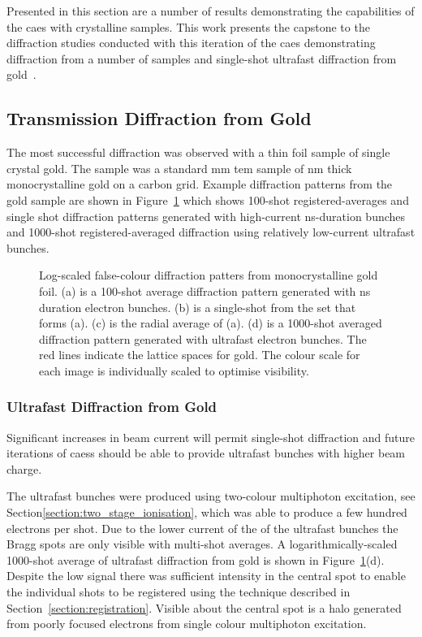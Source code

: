 Presented in this section are a number of results demonstrating the capabilities of the \gls{caes} with crystalline samples.
This work presents the capstone to the diffraction studies conducted with this iteration of the \gls{caes} demonstrating diffraction from a number of samples and single-shot ultrafast diffraction from gold~\cite{speirs_single-shot_2015}.

\subsection{Transmission Diffraction from Gold}

The most successful diffraction was observed with a thin foil sample of single crystal gold.
The sample was a standard \unit[3]{mm} \gls{tem} sample of \unit[11]{nm} thick monocrystalline gold on a carbon grid.
Example diffraction patterns from the gold sample are shown in Figure~\ref{figure:au_diffraction} which shows 100-shot registered-averages and single shot diffraction patterns generated with high-current ns-duration bunches and 1000-shot registered-averaged diffraction using relatively low-current ultrafast bunches.

\begin{figure}
    \center
    
    \caption{Log-scaled false-colour diffraction patters from monocrystalline gold foil. (a) is a 100-shot average diffraction pattern generated with ns duration electron bunches. (b) is a single-shot from the set that forms (a). (c) is the radial average of (a). (d) is a 1000-shot averaged diffraction pattern generated with ultrafast electron bunches. The red lines indicate the lattice spaces for gold. The colour scale for each image is individually scaled to optimise visibility.}
    \label{figure:au_diffraction}
\end{figure}

\subsubsection{Ultrafast Diffraction from Gold}

Significant increases in beam current will permit single-shot diffraction and future iterations of \glspl{caes} should be able to provide ultrafast bunches with higher beam charge.

The ultrafast bunches were produced using two-colour multiphoton excitation, see Section\ref{section:two_stage_ionisation}, which was able to produce a few hundred electrons per shot.
Due to the lower current of the of the ultrafast bunches the Bragg spots are only visible with multi-shot averages.
A logarithmically-scaled 1000-shot average of ultrafast diffraction from gold is shown in Figure~\ref{figure:au_diffraction}(d).
Despite the low signal there was sufficient intensity in the central spot to enable the individual shots to be registered using the technique described in Section~\ref{section:registration}.
Visible about the central spot is a halo generated from poorly focused electrons from single colour multiphoton excitation.

